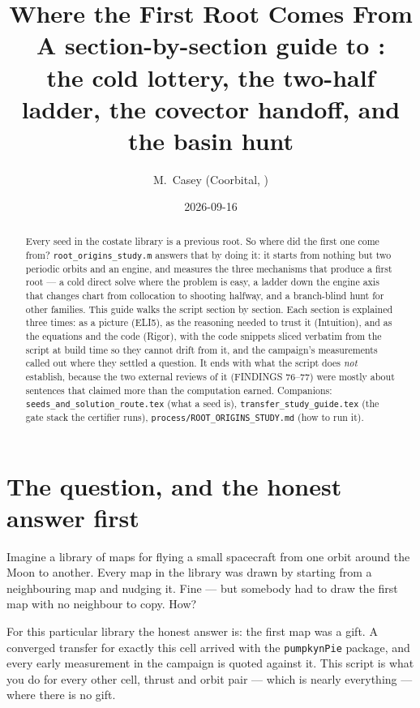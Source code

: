 \documentclass[11pt]{article}
\title{Where the First Root Comes From\\
\large A section-by-section guide to \file{root\_origins\_study.m}:\\
the cold lottery, the two-half ladder, the covector handoff, and the basin hunt}
\author{M.~Casey \quad (Coorbital, \file{orbit\_transfer/DRO\_tulip})}
\date{2026-09-16}
\newcommand{\file}[1]{\texttt{#1}}
\begin{document}
\maketitle

\begin{abstract}
Every seed in the costate library is a previous root. So where did the first
one come from? \file{root\_origins\_study.m} answers that by doing it: it starts
from nothing but two periodic orbits and an engine, and measures the three
mechanisms that produce a first root --- a cold direct solve where the
problem is easy, a ladder down the engine axis that changes chart from
collocation to shooting halfway, and a branch-blind hunt for other families.
This guide walks the script section by section. Each section is explained
three times: as a picture (ELI5), as the reasoning needed to trust it
(Intuition), and as the equations and the code (Rigor), with the code
snippets sliced verbatim from the script at build time so they cannot drift
from it, and the campaign's measurements called out where they settled a
question. It ends with what the script does \emph{not} establish, because the
two external reviews of it (FINDINGS 76--77) were mostly about sentences that
claimed more than the computation earned. Companions:
\file{seeds\_and\_solution\_route.tex} (what a seed is),
\file{transfer\_study\_guide.tex} (the gate stack the certifier runs),
\file{process/ROOT\_ORIGINS\_STUDY.md} (how to run it).
\end{abstract}

\tableofcontents

\section{The question, and the honest answer first}

\begin{eli}
Imagine a library of maps for flying a small spacecraft from one orbit
around the Moon to another. Every map in the library was drawn by starting
from a neighbouring map and nudging it. Fine --- but somebody had to draw the
first map with no neighbour to copy. How?

For this particular library the honest answer is: the first map was a gift.
A converged transfer for exactly this cell arrived with the \file{pumpkynPie}
package, and every early measurement in the campaign is quoted against it.
This script is what you do for every other cell, thrust and orbit pair ---
which is nearly everything --- where there is no gift.
\end{eli}
\end{document}
